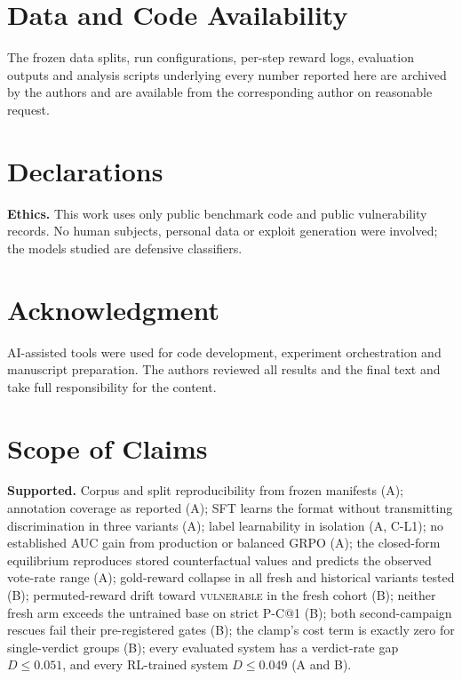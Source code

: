 \documentclass[journal]{IEEEtran}
\makeatletter
\newcommand{\vuln}{\textsc{vulnerable}}
\newcommand{\pc}{P-C@1}
\makeatother
\begin{document}
\section*{Data and Code Availability}
The frozen data splits, run configurations, per-step reward logs, evaluation outputs and analysis scripts underlying every number reported here are archived by the authors and are available from the corresponding author on reasonable request.

\section*{Declarations}
\textbf{Ethics.} This work uses only public benchmark code and public vulnerability records. No human subjects, personal data or exploit generation were involved; the models studied are defensive classifiers.


\section*{Acknowledgment}
AI-assisted tools were used for code development, experiment orchestration and manuscript preparation. The authors reviewed all results and the final text and take full responsibility for the content.

\appendices
\section{Scope of Claims}
\label{app:claims}
\textbf{Supported.} Corpus and split reproducibility from frozen manifests (A); annotation coverage as reported (A); SFT learns the format without transmitting discrimination in three variants (A); label learnability in isolation (A, C-L1); no established AUC gain from production or balanced GRPO (A); the closed-form equilibrium reproduces stored counterfactual values and predicts the observed vote-rate range (A); gold-reward collapse in all fresh and historical variants tested (B); permuted-reward drift toward \vuln{} in the fresh cohort (B); neither fresh arm exceeds the untrained base on strict \pc{} (B); both second-campaign rescues fail their pre-registered gates (B); the clamp's cost term is exactly zero for single-verdict groups (B); every evaluated system has a verdict-rate gap $D\le0.051$, and every RL-trained system $D\le0.049$ (A and B).
\end{document}
